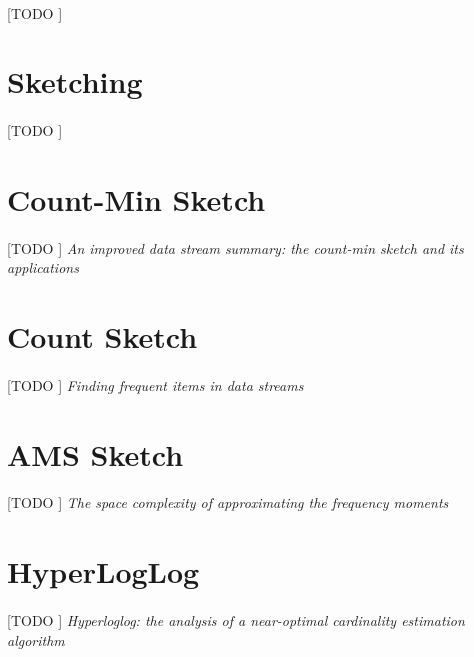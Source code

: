 \documentclass{subfiles}
\begin{document}
        \paragraph{}
        [TODO ]

    \section{Sketching}
    \label{sec:sketching}

      \paragraph{}
      [TODO ]

    \section{Count-Min Sketch}
    \label{sec:count_min_sketch}

      \paragraph{}
      [TODO ] \emph{An improved data stream summary: the count-min sketch and its applications} \cite{cormode2005improved}

    \section{Count Sketch}
    \label{sec:count_sketch}

      \paragraph{}
      [TODO ] \emph{Finding frequent items in data streams} \cite{charikar2002finding}

    \section{AMS Sketch}
    \label{sec:ams_sketch}

      \paragraph{}
      [TODO ] \emph{The space complexity of approximating the frequency moments} \cite{alon1996space}

    \section{HyperLogLog}
    \label{sec:hyper_log_log}

      \paragraph{}
      [TODO ] \emph{Hyperloglog: the analysis of a near-optimal cardinality estimation algorithm} \cite{flajolet2007hyperloglog}
\end{document}
